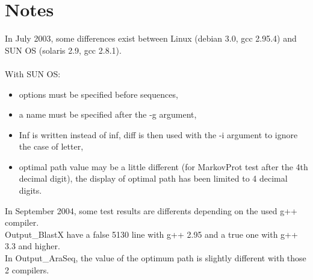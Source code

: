 \documentclass[a4paper,11pt]{article}
\begin{document}
\section{Notes}
In July 2003, some differences exist between Linux (debian 3.0, gcc 2.95.4) and SUN OS (solaris 2.9, gcc 2.8.1). \\
\\
With SUN OS:
\begin{itemize}
\item options must be specified before sequences,
\item a name must be specified after the -g argument,
\item Inf is written instead of inf, diff is then used with the -i argument to ignore the case of letter,
\item optimal path value may be a little different (for MarkovProt test after the 4th decimal digit), the display of optimal path has been limited to 4 decimal digits.
\end{itemize}

In September 2004, some test results are differents depending on the used g++ compiler.\\
Output\_BlastX have a false 5130 line with g++ 2.95 and a true one with g++ 3.3 and higher.\\
In Output\_AraSeq, the value of the optimum path is slightly different with those 2 compilers.\\
\end{document}
